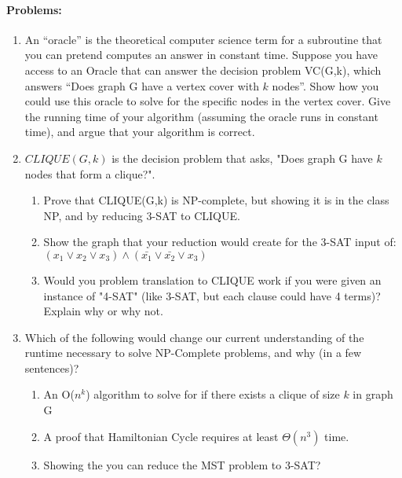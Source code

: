 \documentclass[11pt,letterpaper]{article}
\begin{document}
\paragraph{Problems:}
\begin{enumerate}
\item An ``oracle'' is the theoretical computer science term for a subroutine that you can pretend computes an answer in constant time.  Suppose you have access to an Oracle that can answer the decision problem VC(G,k), which answers ``Does graph G have a vertex cover with $k$ nodes''.  Show how you could use this oracle to solve for the specific nodes in the vertex cover.  Give the running time of your algorithm (assuming the oracle runs in constant time), and argue that your algorithm is correct.

\item $CLIQUE(G,k)$ is the decision problem that asks, "Does graph G have $k$ nodes that form a clique?".  
\begin{enumerate}
\item Prove that CLIQUE(G,k) is NP-complete, but showing it is in the class NP, and by reducing 3-SAT to CLIQUE.  
\item Show the graph that your reduction would create for the 3-SAT input of: \\
$(x_1 \lor x_2 \lor x_3) \land (\bar{x_1} \lor \bar{x_2} \lor x_3)$
\item Would you problem translation to CLIQUE work if you were given an instance of "4-SAT" (like 3-SAT, but each clause could have 4 terms)?  Explain why or why not.
\end{enumerate}

\item Which of the following would change our current understanding of the runtime necessary to solve NP-Complete problems, and why (in a few sentences)?
\begin{enumerate}
    \item An O($n^k$) algorithm to solve for if there exists a clique of size $k$ in graph G
    \item A proof that Hamiltonian Cycle requires at least $\Theta(n^3)$ time.
    \item Showing the you can reduce the MST problem to 3-SAT?
\end{enumerate}
\end{enumerate}
\end{document}
